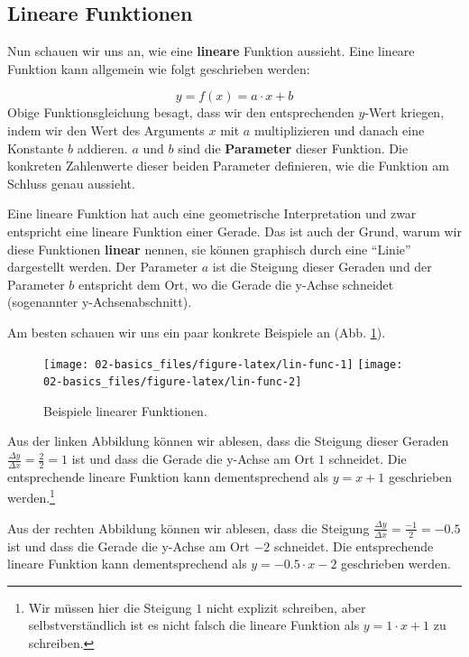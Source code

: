 \documentclass[
]{book}
\begin{document}
\hypertarget{lineare-funktionen}{%
\subsection{Lineare Funktionen}\label{lineare-funktionen}}

Nun schauen wir uns an, wie eine \textbf{lineare} Funktion aussieht. Eine lineare Funktion kann allgemein wie folgt geschrieben werden:

\[
y = f(x) = a \cdot x + b
\]
Obige Funktionsgleichung besagt, dass wir den entsprechenden \(y\)-Wert kriegen, indem wir den Wert des Arguments \(x\) mit \(a\) multiplizieren und danach eine Konstante \(b\) addieren. \(a\) und \(b\) sind die \textbf{Parameter} dieser Funktion. Die konkreten Zahlenwerte dieser beiden Parameter definieren, wie die Funktion am Schluss genau aussieht.

Eine lineare Funktion hat auch eine geometrische Interpretation und zwar entspricht eine lineare Funktion einer Gerade. Das ist auch der Grund, warum wir diese Funktionen \textbf{linear} nennen, sie können graphisch durch eine ``Linie'' dargestellt werden. Der Parameter \(a\) ist die Steigung dieser Geraden und der Parameter \(b\) entspricht dem Ort, wo die Gerade die y-Achse schneidet (sogenannter y-Achsenabschnitt).

Am besten schauen wir uns ein paar konkrete Beispiele an (Abb. \ref{fig:lin-func}).

\begin{figure}

{\centering \texttt{[image: 02-basics\_files/figure-latex/lin-func-1]} \texttt{[image: 02-basics\_files/figure-latex/lin-func-2]} 

}

\caption{Beispiele linearer Funktionen.}\label{fig:lin-func}
\end{figure}

Aus der linken Abbildung können wir ablesen, dass die Steigung dieser Geraden \(\frac{\Delta y}{\Delta x}=\frac{2}{2}=1\) ist und dass die Gerade die y-Achse am Ort \(1\) schneidet. Die entsprechende lineare Funktion kann dementsprechend als \(y = x + 1\) geschrieben werden.\footnote{Wir müssen hier die Steigung \(1\) nicht explizit schreiben, aber selbstverständlich ist es nicht falsch die lineare Funktion als \(y = 1\cdot x + 1\) zu schreiben.}

Aus der rechten Abbildung können wir ablesen, dass die Steigung \(\frac{\Delta y}{\Delta x}=\frac{-1}{2}=-0.5\) ist und dass die Gerade die y-Achse am Ort \(-2\) schneidet. Die entsprechende lineare Funktion kann dementsprechend als \(y = -0.5\cdot x -2\) geschrieben werden.
\end{document}
